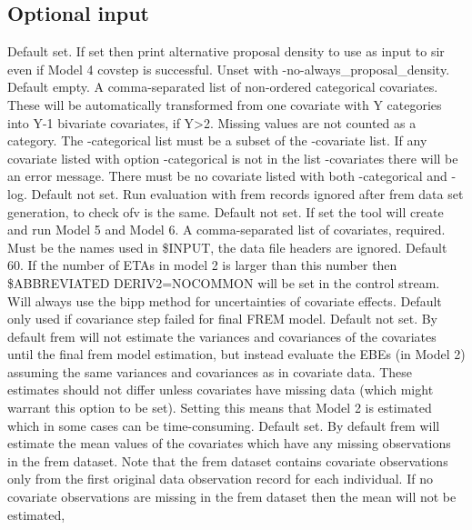 \subsection{Optional input}
\begin{optionlist}
Default set. If set then print alternative proposal density to use as input to sir even if Model 4 covstep is successful.
Unset with -no-always\_proposal\_density.
\nextopt
{}
Default empty. A comma-separated list of non-ordered categorical covariates. These will be automatically transformed from
one covariate with Y categories into Y-1 bivariate covariates, if Y>2. Missing values are not counted as a category.
The -categorical list must be a subset of the -covariate list. If any covariate listed with option -categorical is not
in the list -covariates there will be an error message. There must be no covariate listed with both -categorical and -log.
\nextopt
{}
Default not set. Run evaluation with frem records ignored after frem data set generation, to check ofv is the same.
\nextopt
{}
Default not set. If set the tool will create and run Model 5 and Model 6.
\nextopt
{}
A comma-separated list of covariates, required. Must be the names used in \$INPUT, the data file headers are ignored.
\nextopt
{}
Default 60. If the number of ETAs in model 2 is larger than this number then\\
\$ABBREVIATED DERIV2=NOCOMMON will be set in the control stream.
\nextopt
{}
    Will always use the bipp method for uncertainties of covariate effects. Default only used
    if covariance step failed for final FREM model.
\nextopt
{}
Default not set. By default frem will not estimate the variances and covariances of the covariates until the final frem model estimation,
but instead evaluate the EBEs (in Model 2) assuming the same variances and covariances as in covariate data.
These estimates should not differ unless covariates have missing data (which might warrant this option to be set).
Setting this means that Model 2 is estimated which in some cases can be time-consuming.
\nextopt
{}
Default set. By default frem will estimate the mean values of the covariates which have any
missing observations in the frem dataset. Note that the frem dataset contains covariate
observations only from the first original data observation record for each individual.
If no covariate observations are missing in the frem dataset then the mean will not be estimated,

\end{optionlist}

